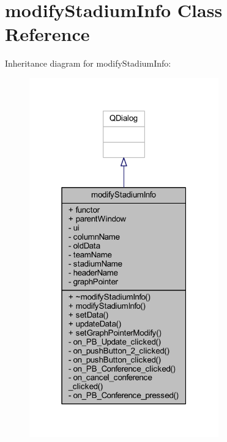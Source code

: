 \hypertarget{classmodify_stadium_info}{}\section{modify\+Stadium\+Info Class Reference}
\label{classmodify_stadium_info}


Inheritance diagram for modify\+Stadium\+Info\+:
\nopagebreak
\begin{figure}[H]
\begin{center}
\leavevmode
\includegraphics[width=232pt]{classmodify_stadium_info__inherit__graph}
\end{center}
\end{figure}


